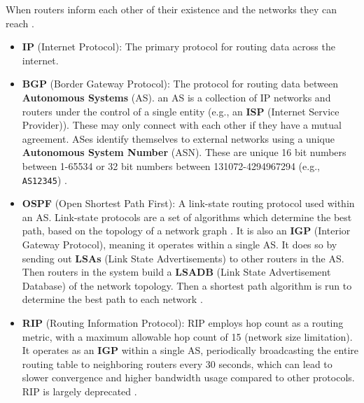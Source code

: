 \begin{Def}

    When routers inform each other of their existence and the networks they can reach \cite{narten_rfc4861}.
\end{Def}
\begin{Def}
    
    \begin{itemize}
        \item \textbf{IP} (Internet Protocol): The primary protocol for routing data across the internet.
        \item \textbf{BGP} (Border Gateway Protocol): The protocol for routing data between \textbf{Autonomous Systems} (AS). 
        an AS is a collection of IP networks and routers under the control of a single entity (e.g., an \textbf{ISP} (Internet Service Provider)).
        These may only connect with each other if they have a mutual agreement. ASes identify themselves to 
        external networks using a unique \textbf{Autonomous System Number} (ASN).
        These are unique 16 bit numbers between 1-65534 or 32 bit numbers between 131072-4294967294 (e.g., \texttt{AS12345}) \cite{cloudflare_autonomous_system}.
        \item \textbf{OSPF} (Open Shortest Path First): A link-state routing protocol used within an AS. Link-state protocols are a set 
        of algorithms which determine the best path, based on the topology of a network graph \cite{kurose_link_state_routing}.
        It is also an \textbf{IGP} (Interior Gateway Protocol), meaning it operates within a single AS. It does so by sending out \textbf{LSAs} (Link State Advertisements) to other routers in the AS.
        Then routers in the system build a \textbf{LSADB} (Link State Advertisement Database) of the network topology. Then a shortest path algorithm is run to determine the best path to each network \cite{certbros_ospf_explained}.
        \item \textbf{RIP} (Routing Information Protocol): RIP employs hop count as a routing metric, with a maximum allowable hop count of 15 (network size limitation).
        It operates as an \textbf{IGP} within a single AS, periodically broadcasting the entire routing table to neighboring routers every 30 seconds,
        which can lead to slower convergence and higher bandwidth usage compared to other protocols. RIP is largely deprecated \cite{javatpoint_rip_protocol}.
    \end{itemize}
\end{Def}

